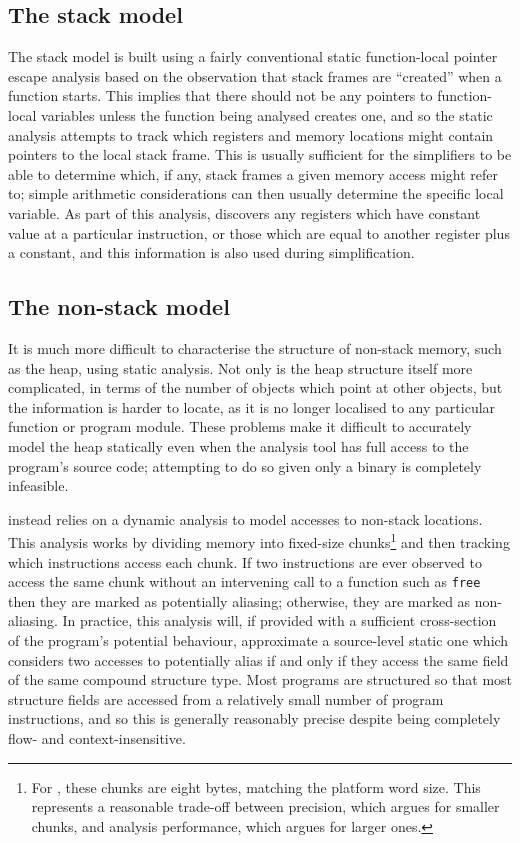 \subsection{The stack model}
The stack model is built using a fairly conventional static
function-local pointer escape analysis\cite[Pages 140--141]{Appel2004} based on the
observation that stack frames are ``created'' when a function starts.
This implies that there should not be any pointers to function-local
variables unless the function being analysed creates one, and so the
static analysis attempts to track which registers and memory locations
might contain pointers to the local stack frame.  This is usually
sufficient for the {\StateMachine} simplifiers to be able to determine
which, if any, stack frames a given memory access might refer to;
simple arithmetic considerations can then usually determine the
specific local variable.  As part of this analysis, {\technique}
discovers any registers which have constant value at a particular
instruction, or those which are equal to another register plus a
constant, and this information is also used during {\StateMachine}
simplification.

\subsection{The non-stack model}
It is much more difficult to characterise the structure of non-stack
memory, such as the heap, using static analysis.  Not only is the heap
structure itself more complicated, in terms of the number of objects
which point at other objects, but the information is harder to locate,
as it is no longer localised to any particular function or program
module.  These problems make it difficult to accurately model the heap
statically even when the analysis tool has full access to the
program's source code; attempting to do so given only a binary is
completely infeasible.

{\Technique} instead relies on a dynamic analysis to model accesses to
non-stack locations.  This analysis works by dividing memory into
fixed-size chunks\footnote{For {\implementation}, these chunks are
  eight bytes, matching the platform word size. This represents a
  reasonable trade-off between precision, which argues for smaller
  chunks, and analysis performance, which argues for larger ones.} and
then tracking which instructions access each chunk.  If two
instructions are ever observed to access the same chunk without an
intervening call to a function such as \texttt{free} then they are
marked as potentially aliasing; otherwise, they are marked as
non-aliasing.  In practice, this analysis will, if provided with a
sufficient cross-section of the program's potential behaviour,
approximate a source-level static one which considers two accesses to
potentially alias if and only if they access the same field of the
same compound structure type.  Most programs are structured so that
most structure fields are accessed from a relatively small number of
program instructions, and so this is generally reasonably precise
despite being completely flow- and context-insensitive.

